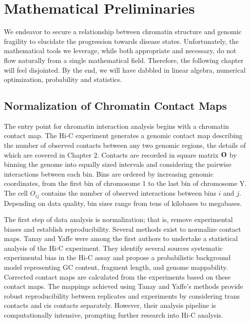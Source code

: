 
\chapter{Mathematical Preliminaries}

We endeavor to secure a relationship between chromatin structure and genomic fragility to elucidate the progression towards
disease states.  Unfortunately, the mathematical tools we leverage, while both appropriate and necessary, do not flow
naturally from a single mathematical field.  Therefore, the following chapter will feel disjointed.  By the end, we will have
dabbled in linear algebra, numerical optimization, probability and statistics.

\section*{Normalization of Chromatin Contact Maps}

The entry point for chromatin interaction analysis begins with a chromatin \gls{contact map}.  The Hi-C experiment generates a
genomic contact map describing the number of observed contacts between any two genomic regions, the details of which are covered
in Chapter 2.  Contacts are recorded in square matrix $\mathbf{O}$ by binning the genome into equally sized intervals and considering
the pairwise interactions between each bin.  Bins are ordered by increasing genomic coordinates, from the first bin of chromosome 1 to
the last bin of chromosome Y.  The cell $O_{ij}$ contains the number of observed interactions between bins $i$ and $j$.  Depending on
data quality, bin sizes range from tens of kilobases to megabases.

The first step of data analysis is \gls{normalization}; that is, remove experimental biases and establish reproducibility.
Several methods exist to normalize contact maps.  Tanay and Yaffe were among the first authors to undertake a statistical analysis of the Hi-C experiment\cite{yaffe2011}.
They identify several sources systematic experimental bias in the Hi-C assay and propose a probabilistic background model representing \gls{GC}
content, fragment length, and genome mappability.  Corrected contact maps are calculated from the experiments based on these contact maps.  The mappings achieved using Tanay
and Yaffe's methods provide robust reproducibility between replicates and experiments by considering \gls{trans contacts} and \gls{cis contacts}
separately\cite{yaffe2011}.  However, their analysis pipeline is computationally intensive, prompting further research into Hi-C analysis.

